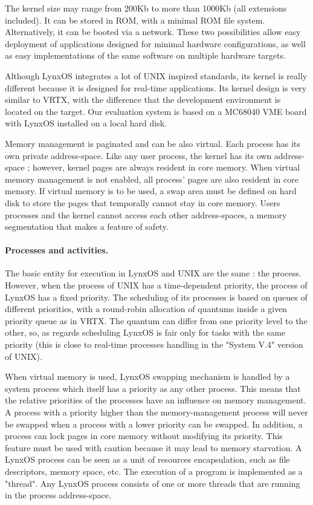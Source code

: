 \documentclass[10pt]{report}
\begin{document}
The kernel size may range from 200Kb to more than 1000Kb (all 
extensions included). It can be stored in ROM, with a minimal ROM
file system. Alternatively, it can be booted via a network. These two
possibilities allow easy deployment of applications designed for minimal 
hardware configurations, as well as easy implementations of the
same software on multiple hardware targets.

Although LynxOS integrates a lot of UNIX inspired standards, its
kernel is really different because it is designed for real-time
applications. Its kernel design is very similar to VRTX, with the
difference that the development environment is located on the
target. Our evaluation system is based on a MC68040 VME board
with LynxOS installed on a local hard disk.

Memory management is paginated and can be also virtual. Each
process has its own private address-space. Like any user
process, the kernel has its own address-space ; however, kernel pages
are always resident in core memory. When virtual memory
management is not enabled, all process' pages are also resident in
core memory. If virtual memory is to be used, a swap area
must be defined on hard disk to store the pages that temporally
cannot stay in core memory. Users processes and the kernel cannot
access each other address-spaces, a memory segmentation that makes a
feature of safety.

\paragraph{Processes and activities.} The basic entity for execution in LynxOS and UNIX are the same : the process. However, when
the process of UNIX has a time-dependent priority, the process of LynxOS has a fixed priority. The scheduling of its processes is
based on queues of different priorities, with a round-robin allocation of quantums inside a given priority queue as in VRTX.
The quantum can differ from one priority level to the other, so, as regards scheduling LynxOS is fair only for tasks with the same
priority (this is close to real-time processes handling in the "System V.4" version of UNIX).

When virtual memory is used, LynxOS swapping mechanism is handled by a system process which itself has a priority
as any other process. This means that the relative priorities of the processes have an influence on memory management. A process with 
a priority higher than the memory-management process will never be swapped when a process with a lower priority can be swapped.
In addition, a process can lock pages in core memory without modifying its priority. This feature must be used with
caution because it may lead to memory starvation. A LynxOS process can be seen as a unit of resources encapsulation, such
as file descriptors, memory space, etc. The execution of a program is implemented as a "thread". Any LynxOS process consists of
one or more threads that are running in the process address-space.
\end{document}
